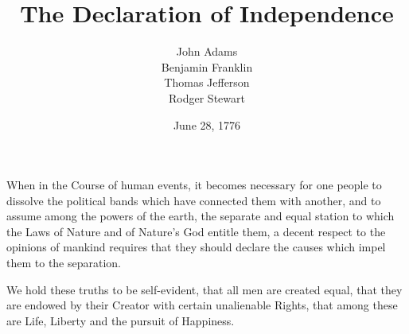 \documentclass{article}
\title{The Declaration of Independence}
\author{John Adams\\
Benjamin Franklin\\
Thomas Jefferson\\
Rodger Stewart}
\date{June 28, 1776}
\begin{document}
\maketitle

When in the Course of human events, it becomes necessary for one people to dissolve the political bands which have connected them with another, and to assume among the powers of the earth, the separate and equal station to which the Laws of Nature and of Nature's God entitle them, a decent respect to the opinions of mankind requires that they should declare the causes which impel them to the separation. 

We hold these truths to be self-evident, that all men are created equal, that they are endowed by their Creator with certain unalienable Rights, that among these are Life, Liberty and the pursuit of Happiness.
\end{document}
